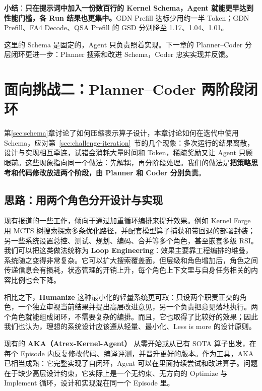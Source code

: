 \begin{ReportQuote}
\textbf{小结}：\textbf{只在提示词中加入一份数百行的 Kernel Schema，Agent 就能更早达到性能门槛，各 Run 结果也更集中。}GDN Prefill 达标少用约一半 Token；GDN Prefill、FA4 Decode、QSA Prefill 的 GSD 分别降至 1.17、1.04、1.01。

这里的 Schema 是固定的，Agent 只负责照着实现。下一章的 Planner–Coder 分层闭环更进一步：Planner 搜索和改进 Schema，Coder 忠实实现并反馈。


\end{ReportQuote}
\SourceSeparator
\clearpage


\section{面向挑战二：Planner–Coder 两阶段闭环}\label{sec:planner-coder}
第\ref{sec:schema}章讨论了如何压缩表示算子设计，本章讨论如何在迭代中使用 Schema，应对第~\ref{sec:challenge-iteration}~节的几个现象：多次运行的结果离散，设计与实现相互牵连，试错会消耗大量时间和 Token，稀疏奖励又让 Agent 只顾眼前。这些现象指向同一个做法：先解耦，再分阶段处理。我们的做法是\textbf{把策略思考和代码修改放进两个阶段，由 Planner 和 Coder 分别负责}。


\SourceSeparator
\subsection{思路：用两个角色分开设计与实现}\label{sec:two-roles}
现有报道的一些工作，倾向于通过加重循环编排来提升效果。例如 Kernel Forge 用 MCTS 树搜索探索多条优化路径，并配套模型算子捕获和带回退的部署封装；另一些系统设置总控、测试、规划、编码、合并等多个角色，甚至嵌套多级 RSI。我们可以把这类做法统称为 \textbf{Loop Engineering}：效果主要靠工程编排的堆叠，系统随之变得非常复杂。它可以扩大搜索覆盖面，但层级和角色增加后，角色之间传递信息会有损耗，状态管理的开销上升，每个角色上下文里与自身任务相关的内容比例也会下降。


相比之下，\textbf{Humanize} 这种最小化的轻量系统更可取：只设两个职责正交的角色，一个独立审视当前结果并提出高层改进意见，另一个负责把意见落地执行。两个角色就能组成闭环，不需要复杂的编排。而且，它也取得了比较好的效果；因此我们也认为，理想的系统设计应该遵从轻量、最小化、Less is more 的设计原则。


\begin{DiagramBlock}
\end{DiagramBlock}
现有的 \textbf{AKA（Atrex-Kernel-Agent）} 从零开始或从已有 SOTA 算子出发，在每个 Episode 内反复修改代码、编译评测，并晋升更好的版本。作为工具，AKA 已相当成熟：它完整实现了自闭环，Agent 可以在里面持续尝试和改进算子。问题在于缺少高层设计约束，它实际上是一个无约束、无方向的 Optimize 与 Implement 循环，设计和实现混在同一个 Episode 里。


